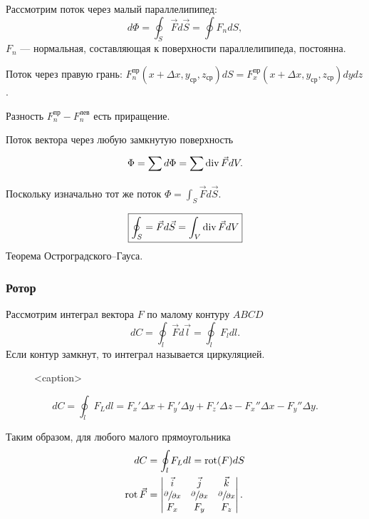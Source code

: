 Рассмотрим поток через малый параллелипипед: \[ d\Phi = \oint_S \vec{F} d\vec{S}
	= \oint F_n dS, \] $F_n$ --- нормальная, составляющая к поверхности
параллелипипеда, постоянна.

Поток через правую грань: $F_n^\text{пр} (x+\Delta x, y_\text{ср}, z_\text{ср})
	dS = F_x^\text{пр} (x+\Delta x, y_\text{ср}, z_\text{ср}) dydz$.

Разность $F_n^\text{пр} - F_n^\text{лев}$ есть приращение.

Поток вектора через любую замкнутую поверхность
\[ \Phi = \sum_{}^{} d\Phi = \sum \operatorname{div} \vec{F} dV. \]
Поскольку изначально тот же поток $\Phi = \int_S \vec{F} d\vec{S}$.

\[
	\boxed{\oint_S = \vec{F} d\vec{S} = \int_V \operatorname{div} \vec{F} dV}
\]
Теорема Остроградского--Гауса.

\subsubsection{Ротор}

Рассмотрим интеграл вектора $F$ по малому контуру $ABCD$ \[ dC = \oint_l \vec{F}
	d\vec{l} = \oint_l F_l dl. \]
Если контур замкнут, то интеграл называется циркуляцией.

\begin{figure}[htbp]
	\centering
	\caption{<caption>}
\end{figure}
\[
	dC = \oint_l F_L dl = F_x' \Delta x + F_y' \Delta y + F_z' \Delta z - F_x''
	\Delta x - F_y'' \Delta y
	.\]

Таким образом, для любого малого прямоугольника
\begin{align*}
	dC           & = \oint_l F_L dl = \operatorname{rot}(F) dS \\
	\operatorname{rot} \vec{F} & =
	\begin{vmatrix}
		\vec{i}                      & \vec{j} & \vec{k} \\
		\sfrac{\partial}{\partial x} &
		\sfrac{\partial}{\partial x} &
		\sfrac{\partial}{\partial x}                     \\
		F_x                          & F_y     & F_z
	\end{vmatrix}
	.
\end{align*}

